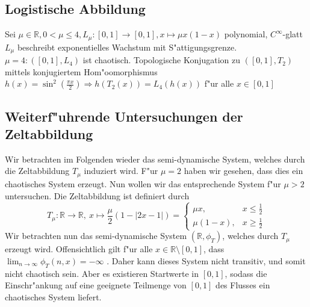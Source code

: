 \documentclass[a4paper, 13pt]{scrreprt}
\theoremstyle{definition} \newtheorem{definition}{Definition}[section]
\newcommand{\RR}{\mathbb{R}}
\begin{document}
\subsection{Logistische Abbildung}
Sei $\mu\in\mathbb{R}, 0<\mu\leq 4, L_{\mu}:[0,1]\rightarrow[0,1], x\mapsto\mu x(1-x)$ polynomial, $C^{\infty}$-glatt\\
$L_\mu$ beschreibt exponentielles Wachstum mit S"attigungsgrenze.\\
$\mu=4: ([0,1],L_4)$ ist chaotisch. Topologische Konjugation zu $([0,1],T_2)$ mittels konjugiertem Hom"oomorphismus $h(x)=\sin^2(\frac{\pi x} 2)\Rightarrow h(T_2(x))=L_4(h(x))$ f"ur alle $x\in[0,1]$

\subsection{Weiterf"uhrende Untersuchungen der Zeltabbildung}
Wir betrachten im Folgenden wieder das \glqq semi\grqq-dynamische System, welches durch die Zeltabbildung $T_\mu$ induziert wird. F"ur $\mu = 2$ haben wir gesehen, dass dies ein chaotisches System erzeugt. Nun wollen wir das entsprechende System f"ur $\mu > 2$ untersuchen. Die Zeltabbildung ist definiert durch
$$ T_\mu\colon \RR \to \RR, \ x\mapsto \frac \mu 2(1-|2x-1|) = \begin{cases} \mu x , &x\leq \frac 12 \\ \mu(1-x) , &x\geq \frac 12\end{cases}$$
Wir betrachten nun das \glqq semi\grqq-dynamische System $(\RR, \phi_{T})$, welches durch $T_\mu$ erzeugt wird. Offensichtlich gilt f"ur alle $x\in\RR\setminus[0,1]$, dass $\lim_{n\to\infty}{\phi_T(n, x)} = -\infty$ . Daher kann dieses System nicht transitiv, und somit nicht chaotisch sein. Aber es existieren Startwerte in $[0,1]$, sodass die Einschr"ankung auf eine geeignete Teilmenge von $[0,1]$ des Flusses ein chaotisches System liefert.
\end{document}
